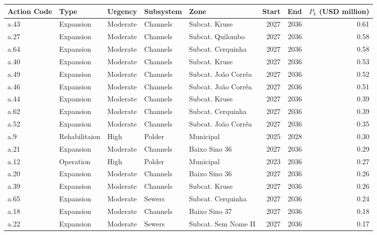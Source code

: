 \documentclass[12pt]{article}
\begin{document}
\begin{table}[h]
    \centering
    \tiny
\begin{tabular}{lllllrrr}
\toprule
\textbf{Action Code} &          \textbf{Type}&   \textbf{Urgency} &   \textbf{Subsystem} &                \textbf{Zone} &  \textbf{Start} &  \textbf{End} &    \textbf{$P_k$ (USD million)} \\
\midrule
a.43 &     Expansion &  Moderate & Channels &       Subcat. Kruse &   2027 & 2036 &  0.61 \\
a.27 &     Expansion &  Moderate & Channels &    Subcat. Quilombo &   2027 & 2036 &  0.58 \\
a.64 &     Expansion &  Moderate & Channels &   Subcat. Cerquinha &   2027 & 2036 &  0.58 \\
a.40 &     Expansion &  Moderate & Channels &       Subcat. Kruse &   2027 & 2036 &  0.53 \\
a.49 &     Expansion &  Moderate & Channels & Subcat. João Corrêa &   2027 & 2036 &  0.52 \\
a.46 &     Expansion &  Moderate & Channels & Subcat. João Corrêa &   2027 & 2036 &  0.51 \\
a.44 &     Expansion &  Moderate & Channels &       Subcat. Kruse &   2027 & 2036 &  0.39 \\
a.62 &     Expansion &  Moderate & Channels &   Subcat. Cerquinha &   2027 & 2036 &  0.39 \\
a.52 &     Expansion &  Moderate & Channels & Subcat. João Corrêa &   2027 & 2036 &  0.35 \\
 a.9 & Rehabilitaion &      High &   Polder &           Municipal &   2025 & 2028 &  0.30 \\
a.21 &     Expansion &  Moderate & Channels &       Baixo Sino 36 &   2027 & 2036 &  0.29 \\
a.12 &     Operation &      High &   Polder &           Municipal &   2023 & 2036 &  0.27 \\
a.20 &     Expansion &  Moderate & Channels &       Baixo Sino 36 &   2027 & 2036 &  0.26 \\
a.39 &     Expansion &  Moderate & Channels &       Subcat. Kruse &   2027 & 2036 &  0.26 \\
a.65 &     Expansion &  Moderate &   Sewers &   Subcat. Cerquinha &   2027 & 2036 &  0.24 \\
a.18 &     Expansion &  Moderate & Channels &       Baixo Sino 37 &   2027 & 2036 &  0.18 \\
a.22 &     Expansion &  Moderate &   Sewers & Subcat. Sem Nome II &   2027 & 2036 &  0.17 \\

\end{tabular}
\end{table}
\end{document}
